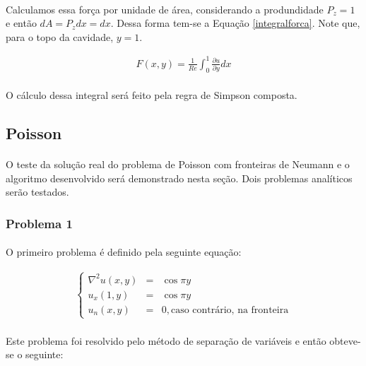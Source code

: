 \documentclass[validacao.tex]{subfiles}
\begin{document}
\paragraph{} Calculamos essa força por unidade de área, considerando a produndidade $P_z=1$ e então $dA=P_z dx = dx$. Dessa forma tem-se a Equação \ref{integralforca}. Note que, para o topo da cavidade, $y=1$.

\begin{eqnarray}
F(x,y)=\frac{1}{\mathit{Re}}\int_0^1 \frac{\partial u}{\partial y} dx \label{integralforca}
\end{eqnarray}

\paragraph{} O cálculo dessa integral será feito pela regra de Simpson composta.

\subsection{Poisson}
\paragraph{} O teste da solução real do problema de Poisson com fronteiras de Neumann e o algoritmo desenvolvido será demonstrado nesta seção. Dois problemas analíticos serão testados.

\subsubsection{Problema 1}

\paragraph{} O primeiro problema é definido pela seguinte equação:

\begin{eqnarray}
\left\{\begin{array}{ccl}
\nabla^2u(x,y) & = & \cos\pi y\\
u_x(1,y) & = & \cos\pi y\\
u_n(x,y) & = & 0, \textrm{caso contrário, na fronteira}
\end{array}\right.
\end{eqnarray}

\paragraph{} Este problema foi resolvido pelo método de separação de variáveis e então obteve-se o seguinte:
\end{document}
